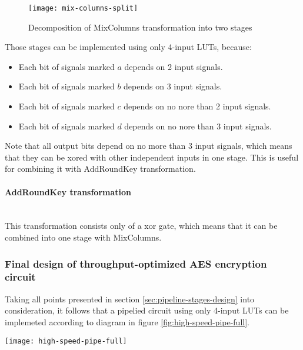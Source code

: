\begin{figure}[!h]
\centering
\texttt{[image: mix-columns-split]}
\caption{Decomposition of MixColumns transformation into two stages}
\label{fig:mix-columns-split}
\end{figure}

Those stages can be implemented using only 4-input LUTs, because:
\begin{itemize}[nolistsep]
\item Each bit of signals marked $a$ depends on 2 input signals.
\item Each bit of signals marked $b$ depends on 3 input signals.
\item Each bit of signals marked $c$ depends on no nore than 2 input signals.
\item Each bit of signals marked $d$ depends on no nore than 3 input signals.
\end{itemize}

Note that all output bits depend on no more than 3 input signals, which means that they can be xored with other independent inputs in one stage. This is useful for combining it with AddRoundKey transformation.


\paragraph{AddRoundKey transformation}\mbox{}\\
This transformation consists only of a xor gate, which means that it can be combined into one stage with MixColumns.


\subsubsection{Final design of throughput-optimized AES encryption circuit}
Taking all points presented in section \ref{sec:pipeline-stages-design} into consideration, it follows that a pipelied circuit using only 4-input LUTs can be implemeted according to diagram in figure \ref{fig:high-speed-pipe-full}.


\begin{sidewaysfigure}[!h]
\label{fig:high-speed-pipe-full}
\centering
\texttt{[image: high-speed-pipe-full]}
\caption{Throughput optimized AES encryption pipelined circuit}
\end{sidewaysfigure}